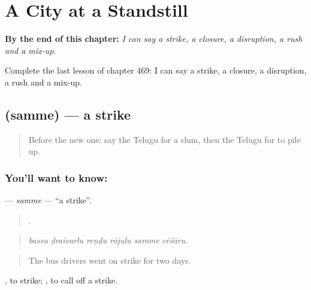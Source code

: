 
\chapter{A City at a Standstill}
\label{ch:te-a-city-at-a-standstill}

\begin{chapteropening}
\textbf{By the end of this chapter:} \emph{I can say a strike, a closure, a disruption, a rush and a mix-up.}

Complete the last lesson of chapter 469: I can say a strike, a closure, a disruption, a rush and a mix-up.
\end{chapteropening}

\section[\texorpdfstring{\te{సమ్మె} (samme)}{సమ్మె (samme)}]{ (samme) — a strike}

\label{lesson:TE-C469-samme}



\begin{quote}
Before the new one: say the Telugu for a slum, then the Telugu for to pile up.
\end{quote}

\subsection*{You'll want to know: }
\textbf{} — \emph{samme} — \textquotedblleft{}a strike\textquotedblright{}.

\begin{quote}
     .
\end{quote}

\begin{quote}
\emph{bassu ḍraivarlu reṇḍu rōjulu samme cēśāru.}
\end{quote}

\begin{quote}
The bus drivers went on strike for two days.
\end{quote}

 , to strike;  , to call off a strike.

